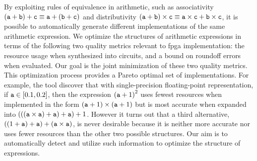 
By exploiting rules of equivalence in arithmetic, such as associativity $(\texttt{a}
+ \texttt{b}) + \texttt{c} \equiv \texttt{a} + (\texttt{b} + \texttt{c})$ and distributivity $(\texttt{a}
+ \texttt{b}) \times \texttt{c} \equiv \texttt{a} \times \texttt{c} + \texttt{b} \times \texttt{c}$, it
is possible to automatically generate different implementations of the same
arithmetic expression.  We optimize the structures of arithmetic expressions
in terms of the following two quality metrics relevant to \gls{fpga}
implementation: the resource usage when synthesized into circuits, and a bound
on roundoff errors when evaluated. Our goal is the joint minimization of these
two quality metrics.  This optimization process provides a Pareto optimal set
of implementations.  For example, the tool discover that with single-precision
floating-point representation, if $\texttt{a} \in [0.1, 0.2]$, then the expression
${(\texttt{a} + 1)}^2$ uses fewest resources when implemented in the form $(\texttt{a} +
1) \times (\texttt{a} + 1)$ but is most accurate when expanded into $(((\texttt{a} \times
\texttt{a}) + \texttt{a}) + \texttt{a}) + 1$.  However it turns out that a third alternative,
$((1 + \texttt{a}) + \texttt{a}) + (\texttt{a} \times \texttt{a})$, is never desirable because it
is neither more accurate nor uses fewer resources than the other two possible
structures. Our aim is to automatically detect and utilize such information to
optimize the structure of expressions.

